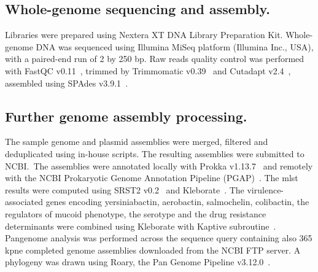 \documentclass[12pt,a4paper]{article}
\begin{document}
\subsection{Whole-genome sequencing and assembly.}\label{subsec:proc_raw}
Libraries were prepared using Nextera XT DNA Library Preparation Kit.
Whole-genome DNA was sequenced using Illumina MiSeq platform (Illumina Inc., USA),
with a paired-end run of 2 by 250 bp.
Raw reads quality control was performed with FastQC v0.11~\cite{FastQC},  %
trimmed by Trimmomatic v0.39~\cite{Trimmomatic}
and Cutadapt v2.4~\cite{Cutadapt},
assembled using SPAdes v3.9.1~\cite{SPAdes}.

\subsection{Further genome assembly processing.}\label{subsec:proc_ass}
The sample genome and plasmid assemblies were merged, filtered and deduplicated using in-house scripts.
The resulting assemblies were submitted to NCBI.\
The assemblies were annotated locally with Prokka v1.13.7~\cite{Prokka}
and remotely with the NCBI Prokaryotic Genome Annotation Pipeline (PGAP)~\cite{PGAP}.
The \gls{mlst} results were computed using SRST2 v0.2~\cite{SRST2}
and Kleborate~\cite{Kleborate}.
The virulence-associated genes encoding yersiniabactin, aerobactin, salmochelin, colibactin, the regulators of mucoid
phenotype, the serotype and the drug resistance determinants were combined using Kleborate with
Kaptive subroutine~\cite{Kaptive}.
Pangenome analysis was performed across the sequence query containing also 365 \gls{kpne} completed genome assemblies
downloaded from the NCBI FTP server.
A phylogeny was drawn using Roary, the Pan Genome Pipeline v3.12.0~\cite{Roary}.
\end{document}
